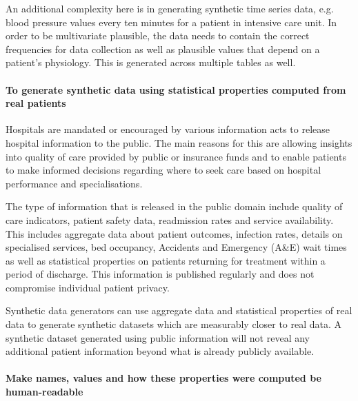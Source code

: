 \documentclass[11pt]{article}
\begin{document}
An additional complexity here is in generating synthetic time series data, e.g. blood pressure values every ten minutes for a patient in intensive care unit. In order to be multivariate plausible, the data needs to contain the correct frequencies for data collection as well as plausible values that depend on a patient's physiology. This is generated across multiple tables as well.  

\paragraph{To generate synthetic data using statistical properties computed from real patients}
Hospitals are mandated or encouraged by various information acts to release hospital information to the public. The main reasons for this are allowing insights into quality of care provided by public or insurance funds and to enable patients to make informed decisions regarding where to seek care based on hospital performance and specialisations\cite{Werner2005}. 

The type of information that is released in the public domain include quality of care indicators, patient safety data, readmission rates and service availability. This includes aggregate data about patient outcomes, infection rates, details on specialised services, bed occupancy, Accidents and Emergency (A\&E) wait times as well as statistical properties on patients returning for treatment within a period of discharge. This information is published regularly and does not compromise individual patient privacy.  

Synthetic data generators can use aggregate data and statistical properties of real data to generate synthetic datasets which are measurably closer to real data. A synthetic dataset generated using public information will not reveal any additional patient information beyond what is already publicly available.

\paragraph{Make names, values and how these properties were computed be human-readable}


    
\end{document}

